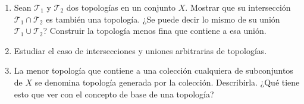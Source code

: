\documentclass{article}
\begin{document}
\begin{ej}[Número 1.6]
	\begin{enumerate}
	\item Sean $\displaystyle \mathcal{T}_{1} $ y $\displaystyle \mathcal{T}_{2} $ dos topologías en un conjunto $\displaystyle X $. Mostrar que su intersección $\displaystyle \mathcal{T}_{1} \cap \mathcal{T}_{2} $ es también una topología. ¿Se puede decir lo mismo de su unión $\displaystyle \mathcal{T}_{1} \cup \mathcal{T}_{2} $? Construir la topología menos fina que contiene a esa unión.
	\item Estudiar el caso de intersecciones y uniones arbitrarias de topologías.
	\item La menor topología que contiene a una colección cualquiera de subconjuntos de $\displaystyle X $ se denomina topología generada por la colección. Describirla. ¿Qué tiene esto que ver con el concepto de base de una topología?
	\end{enumerate}
\end{ej}
\end{document}

